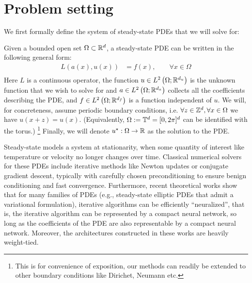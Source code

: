 \section{Problem setting}

We first formally define the system of steady-state PDEs that we will solve for:
\begin{definition} \label{def:steady_state_PDE}
    Given a bounded open set $\Omega \subset \mathbb{R}^d$, 
    a steady-state PDE 
    can be written in the following general form:
    \begin{equation}
        \begin{split}
            L(a(x), u(x)) &= f(x), \qquad \forall x \in \Omega \\
        \end{split}
    \end{equation}
    Here $L$ is a continuous operator, the function
    $u \in L^2\left(\Omega; \mathbb{R}^{d_u}\right)$
    is the unknown function that we wish to solve for
    and 
    $a \in L^2\left(\Omega; \mathbb{R}^{d_a}\right)$
    collects all the coefficients describing the PDE, and 
    $f \in L^2\left(\Omega; \mathbb{R}^{d_f}\right)$
    is a function independent of $u$.
    We will, for concreteness, assume periodic boundary conditions, i.e. $\forall z \in \mathbb{Z}^d, \forall x \in \Omega$ we have $u(x + z) = u(x)$. (Equivalently,  
    $\Omega:= {\mathbb{T}}^d = [0, 2\pi]^d$ can be identified with the torus.)
    \footnote{
   This is for convenience of exposition, our methods can readily be extended to other boundary conditions 
    like Dirichet, Neumann etc. 
    }
    Finally, we will denote $u^\star: \Omega \to \mathbb{R}$ as the solution 
    to the PDE.
\end{definition}
Steady-state models a system at stationarity, \ie when some quantity of interest like temperature or velocity no longer changes over time. Classical numerical solvers for these PDEs include iterative methods like Newton updates
or conjugate gradient descent, typically with carefully chosen preconditioning to ensure benign conditioning and fast convergence.   
Furthermore, recent theoretical works \citep{marwah2021parametric,chen2021representation,marwah2022neural} 
show that for many families of PDEs 
(e.g., steady-state elliptic PDEs that admit a variational formulation), 
iterative algorithms can be efficiently ``neuralized'', 
that is, the iterative algorithm can be represented by a compact neural network, 
so long as the coefficients of the PDE are also representable by a compact neural network.
Moreover, the architectures constructed in these works are heavily weight-tied.    



